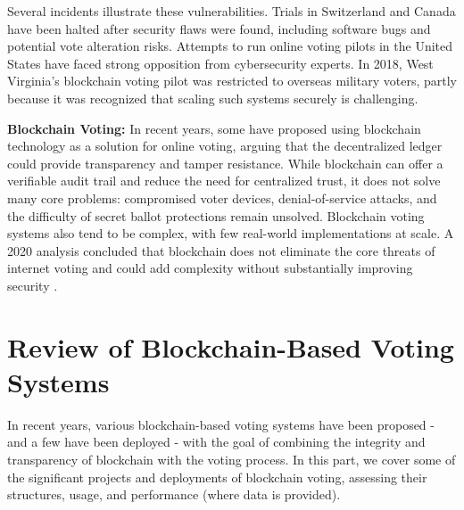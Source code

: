 \documentclass[a4paper,10pt]{report}
\begin{document}
Several incidents illustrate these vulnerabilities. Trials in Switzerland and Canada have been halted after security flaws were found, including software bugs and potential vote alteration risks. Attempts to run online voting pilots in the United States have faced strong opposition from cybersecurity experts. In 2018, West Virginia’s blockchain voting pilot was restricted to overseas military voters, partly because it was recognized that scaling such systems securely is challenging.

\textbf {Blockchain Voting:} In recent years, some have proposed using blockchain technology as a solution for online voting, arguing that the decentralized ledger could provide transparency and tamper resistance. While blockchain can offer a verifiable audit trail and reduce the need for centralized trust, it does not solve many core problems: compromised voter devices, denial-of-service attacks, and the difficulty of secret ballot protections remain unsolved. Blockchain voting systems also tend to be complex, with few real-world implementations at scale. A 2020 analysis concluded that blockchain does not eliminate the core threats of internet voting and could add complexity without substantially improving security \cite{grimsby2020}.

\section{Review of Blockchain-Based Voting Systems}

In recent years, various blockchain-based voting systems have been proposed - and a few have been deployed - with the goal of combining the integrity and transparency of blockchain with the voting process.  In this part, we cover some of the significant projects and deployments of blockchain voting, assessing their structures, usage, and performance (where data is provided).
\end{document}
